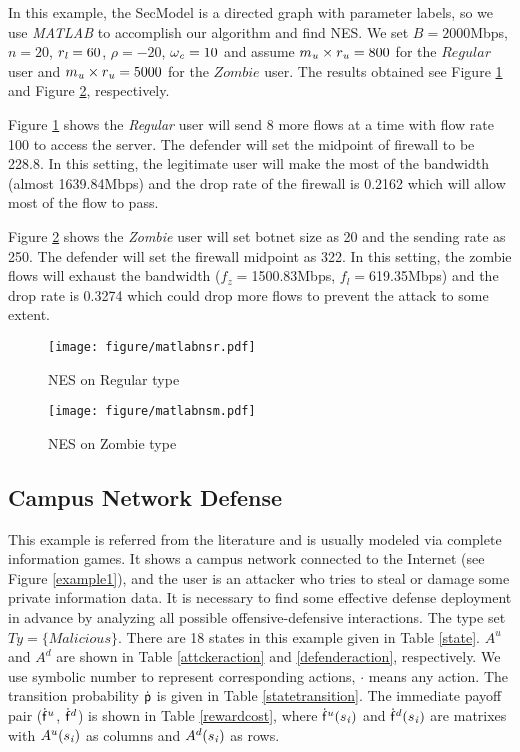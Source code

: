 \documentclass[10pt, conference, compsocconf]{IEEEtran}
\begin{document}
In this example, the SecModel is a directed graph with parameter labels, so we use {\it MATLAB} to accomplish our algorithm and find NES.
We set $B=2000$Mbps, $n=20$, $r_{\it l}=60$, $\rho=-20$, $\omega_{\it c}=10$ and assume $m_{\it u}\times r_{\it u}=800$ for the $Regular$ user and $m_{\it u}\times r_{\it u}=5000$ for the $Zombie$ user.
The results obtained see Figure \ref{nes3} and Figure \ref{nes4}, respectively.

Figure \ref{nes3} shows the \textit{Regular} user will send 8 more flows at a time with flow rate 100 to access the server. The defender will set the midpoint of firewall to be 228.8.
In this setting, the legitimate user will make the most of the bandwidth (almost 1639.84Mbps) and the drop rate of the firewall is 0.2162 which will allow most of the flow to pass.

Figure \ref{nes4} shows the \textit{Zombie} user will set botnet size as 20 and the sending rate as 250.
The defender will set the firewall midpoint as 322.
In this setting, the zombie flows will exhaust the bandwidth ($f_z=$1500.83Mbps, $f_l=$619.35Mbps) and the drop rate is 0.3274 which could drop more flows to prevent the attack to some extent.
\begin{figure}[h]
\centering
\texttt{[image: figure/matlabnsr.pdf]}
\caption{NES on Regular type}
\label{nes3}
\end{figure}
\begin{figure}[h]
\centering
\texttt{[image: figure/matlabnsm.pdf]}
\caption{NES on Zombie type}
\label{nes4}
\end{figure}

\subsection{Campus Network Defense}
This example is referred from the literature \cite{klye} and is usually modeled via complete information games.
It shows a campus network connected to the Internet (see Figure \ref{example1}), and the user is an attacker who tries to steal or damage some private information data.
It is necessary to find some effective defense deployment in advance by analyzing all possible offensive-defensive interactions.
The type set $\textit{Ty}=\{\textit{Malicious}\}$.
There are 18 states in this example given in Table \ref{state}.
$A^{u}$ and $A^{d}$ are shown in Table \ref{attckeraction} and \ref{defenderaction}, respectively.
We use symbolic number to represent corresponding actions, $\cdot$ means any action.
The transition probability ${\sf \dot{p}}$ is given in Table \ref{statetransition}.
The immediate payoff pair (${\sf \dot{f}}^u$, ${\sf \dot{f}}^d$) is shown in Table \ref{rewardcost}, where ${\sf \dot{f}}^u(s_{\it i})$ and ${\sf \dot{f}}^d(s_{\it i})$ are matrixes with $A^{u}(s_{\it i})$ as columns and $A^{d}(s_{\it i})$ as rows.
\end{document}
